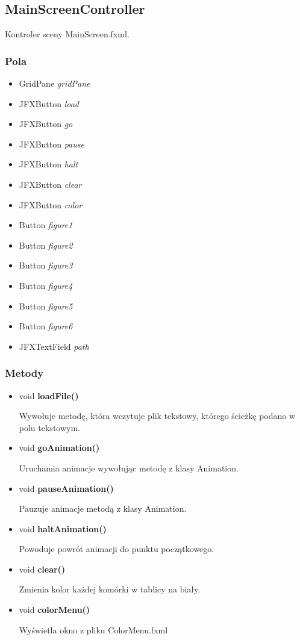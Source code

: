 \documentclass[a4paper,11pt]{article}
\begin{document}
\subsection{MainScreenController}
Kontroler sceny MainScreen.fxml.
\subsubsection{Pola}
\begin{itemize}
\item GridPane \textit{gridPane}
\item JFXButton \textit{load}
\item JFXButton \textit{go}
\item JFXButton \textit{pause}
\item JFXButton \textit{halt}
\item JFXButton \textit{clear}
\item JFXButton \textit{color}
\item Button \textit{figure1}
\item Button \textit{figure2}
\item Button \textit{figure3}
\item Button \textit{figure4}
\item Button \textit{figure5}
\item Button \textit{figure6}
\item JFXTextField \textit{path}
\end{itemize}
\subsubsection{Metody}
\begin{itemize}
\item void \textbf{loadFile()}

Wywołuje metodę, która wczytuje plik tekstowy, którego ścieżkę podano w polu tekstowym.
\item void \textbf{goAnimation()}

Uruchamia animacje wywołując metodę z klasy Animation.
\item void \textbf{pauseAnimation()}

Pauzuje animacje metodą z klasy Animation.
\item void \textbf{haltAnimation()}

Powoduje powrót animacji do punktu początkowego.
\item void \textbf{clear()}

Zmienia kolor każdej komórki w tablicy na biały.
\item void \textbf{colorMenu()}

Wyświetla okno z pliku ColorMenu.fxml
\end{itemize}
\end{document}
